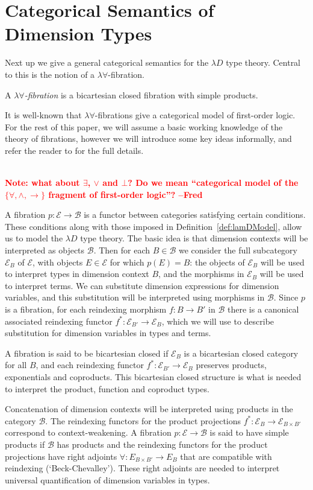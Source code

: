 \documentclass[a4paper,UKenglish]{lipics}
\newcommand\note[1]{{ \bf \textcolor{red} {\vspace{2mm}\; \\ Note: #1\\}}}
\newcommand{\B}{\mathcal{B}}
\newcommand{\E}{\mathcal{E}}
\begin{document}
\section{Categorical Semantics of Dimension Types} \label{sec:sem}
Next up we give a general categorical semantics for the $\lambda D$ type theory. Central to this is the notion of a $\lambda \forall$-fibration.

\begin{definition}
A \emph{$\lambda\forall$-fibration} is a bicartesian closed fibration with simple products.
\end{definition}

It is well-known that $\lambda \forall$-fibrations give a categorical model of first-order logic. For the rest of this paper, we will assume a basic working knowledge of the theory of fibrations, however we will introduce some key ideas informally, and refer the reader to \cite{jacobs1999categorical} for the full details.

\note{what about $\exists$, $\lor$ and $\bot$? Do we mean ``categorical model of the $\{\forall,\land,\to\}$ fragment of first-order logic''? --Fred}

A fibration $p:\E\to\B$ is a functor between categories satisfying certain conditions. These conditions along with those imposed in Definition~\ref{def:lamDModel}, allow us to model the $\lambda D$ type theory. The basic idea is that dimension contexts will be interpreted as objects $\B$. Then for each $B\in\B$ we consider the full subcategory $\E_B$ of $\E$, with objects $E\in\E$ for which $p(E)=B$: the objects of $\E_B$ will be used to interpret types in dimension context $B$, and the morphisms in $\E_B$ will be used to interpret terms. We can substitute dimension expressions for dimension variables, and this substitution will be interpreted using morphisms in $\B$. Since $p$ is a fibration, for each reindexing morphism $f:B\to B'$ in $\B$ there is a canonical associated reindexing functor $f^*:\E_{B'}\to \E_B$, which we will use to describe substitution for dimension variables in types and terms.

A fibration is said to be bicartesian closed if $\E_B$ is a bicartesian closed category for all $B$, and each reindexing functor $f^*:\E_{B'}\to\E_B$ preserves products, exponentials and coproducts. This bicartesian closed structure is what is needed to interpret the product, function and coproduct types.

Concatenation of dimension contexts will be interpreted using products in the category $\B$. The reindexing functors for the product projections $f^*:\E_{B}\to \E_{B\times B'}$ correspond to context-weakening. A fibration $p:\E\to \B$ is said to have simple products if $\B$ has products and the reindexing functors for the product projections have right adjoints $\forall:E_{B\times B'}\to E_B$ that are compatible with reindexing (`Beck-Chevalley'). These right adjoints are needed to interpret universal quantification of dimension variables in types.
\end{document}
